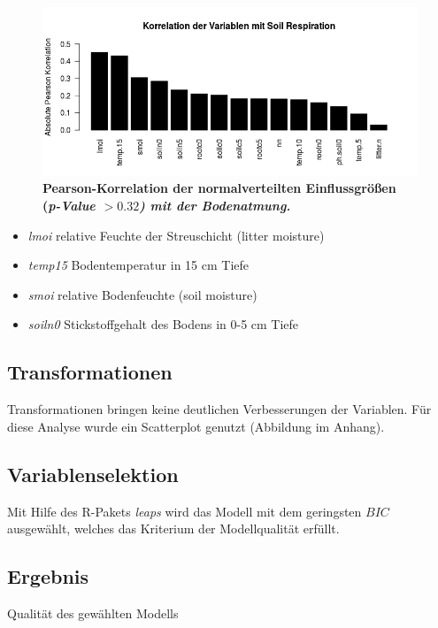\begin{figure}
	\centering
	\includegraphics[width=\textwidth]{fig/model/correlation-pearson-normal.png}
	\caption{\bf{Pearson-Korrelation} der normalverteilten Einflussgrößen (\it{p-Value} $> 0.32$) mit der Bodenatmung.}
    \label{fig:pearson}
\end{figure}

\begin{itemize}
\tightlist
\item
  \emph{lmoi} relative Feuchte der Streuschicht (litter moisture)
\item
  \emph{temp15} Bodentemperatur in 15 cm Tiefe
\item
  \emph{smoi} relative Bodenfeuchte (soil moisture)
\item
  \emph{soiln0} Stickstoffgehalt des Bodens in 0-5 cm Tiefe
\end{itemize}

\subsection{Transformationen}

Transformationen bringen keine deutlichen Verbesserungen der Variablen. Für diese Analyse wurde ein Scatterplot genutzt (Abbildung im Anhang).

\subsection{Variablenselektion}

Mit Hilfe des R-Pakets \emph{leaps} wird das Modell mit dem geringsten $BIC$ ausgewählt, welches das Kriterium der Modellqualität erfüllt.

\subsection{Ergebnis}
Qualität des gewählten Modells

